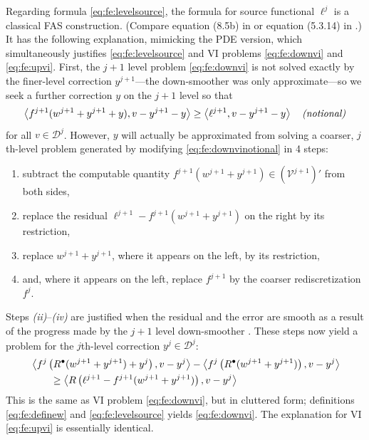 \documentclass[letterpaper,final,12pt,reqno]{amsart}
\theoremstyle{cstyle}
\theoremstyle{cstyle*}
\theoremstyle{dstyle}
\numberwithin{equation}{section}
\numberwithin{figure}{section}
\numberwithin{table}{section}
\numberwithin{theorem}{section}
\newcommand{\ip}[2]{\left<#1,#2\right>}
\newcommand{\iR}{R^{\bullet}}
\begin{document}
Regarding formula \eqref{eq:fe:levelsource}, the formula for source functional $\ell^j$ is a classical FAS construction.  (Compare equation (8.5b) in \cite{BrandtLivne2011} or equation (5.3.14) in \cite{Trottenbergetal2001}.)  It has the following explanation, mimicking the PDE version, which simultaneously justifies \eqref{eq:fe:levelsource} and VI problems \eqref{eq:fe:downvi} and \eqref{eq:fe:upvi}.  First, the $j+1$ level problem \eqref{eq:fe:downvi} is not solved exactly by the finer-level correction $y^{j+1}$---the down-smoother was only approximate---so we seek a further correction $y$ on the $j+1$ level so that
\begin{equation}
\ip{f^{j+1}(w^{j+1}+y^{j+1}+y)}{v-y^{j+1}-y} \ge \ip{\ell^{j+1}}{v-y^{j+1}-y} \quad \text{\emph{(notional)}} \label{eq:fe:downvinotional}
\end{equation}
for all $v\in \mathcal{D}^j$.  However, $y$ will actually be approximated from solving a coarser, $j$th-level problem generated by modifying \eqref{eq:fe:downvinotional} in 4 steps:
\begin{enumerate}
\item subtract the computable quantity $f^{j+1}(w^{j+1}+y^{j+1}) \in (\mathcal{V}^{j+1})'$ from both sides,
\item replace the residual $\ell^{j+1}-f^{j+1}(w^{j+1}+y^{j+1})$ on the right by its restriction,
\item replace $w^{j+1}+y^{j+1}$, where it appears on the left, by its restriction,
\item and, where it appears on the left, replace $f^{j+1}$ by the coarser rediscretization $f^j$.
\end{enumerate}
Steps \emph{(ii)}--\emph{(iv)} are justified when the residual and the error are smooth as a result of the progress made by the $j+1$ level down-smoother \cite[subsection 5.3.4, for example]{Trottenbergetal2001}.  These steps now yield a problem for the $j$th-level correction $y^j \in \mathcal{D}^j$:
\begin{align}
&\ip{f^j\left(\iR(w^{j+1}+y^{j+1})+y^j\right)}{v-y^j} - \ip{f^j\left(\iR(w^{j+1}+y^{j+1})\right)}{v-y^j} \label{eq:fe:downvicluttered} \\
&\qquad \ge \ip{R\left(\ell^{j+1}-f^{j+1}(w^{j+1}+y^{j+1})\right)}{v-y^j} \notag
\end{align}
This is the same as VI problem \eqref{eq:fe:downvi}, but in cluttered form; definitions \eqref{eq:fe:definew} and \eqref{eq:fe:levelsource} yields \eqref{eq:fe:downvi}.  The explanation for VI \eqref{eq:fe:upvi} is essentially identical.
\end{document}
